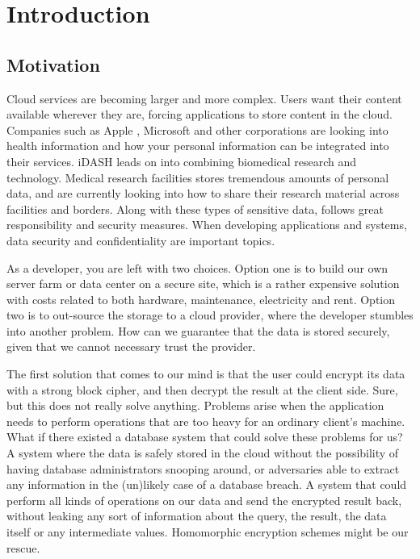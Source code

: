 \chapter{Introduction}
\label{chp:introduction}

\section{Motivation}

Cloud services are becoming larger and more complex. Users want their content available wherever they are, forcing applications to store content in the cloud. Companies such as Apple \cite{apple_health}, Microsoft \cite{microsoft_health} and other corporations are looking into health information and how your personal information can be integrated into their services. iDASH \cite{iDASH} leads on into combining biomedical research and technology.  Medical research facilities stores tremendous amounts of personal data, and are currently looking into how to share their research material across facilities and borders. Along with these types of sensitive data, follows great responsibility and security measures. When developing applications and systems, data security and confidentiality are important topics.


As a developer, you are left with two choices. Option one is to build our own server farm or data center on a secure site, which is a rather expensive solution with costs related to both hardware, maintenance, electricity and rent. Option two is to out-source the storage to a cloud provider, where the developer stumbles into another problem. How can we guarantee that the data is stored securely, given that we cannot necessary trust the provider.

The first solution that comes to our mind is that the user could encrypt its data with a strong block cipher, and then decrypt the result at the client side. Sure, but this does not really solve anything. Problems arise when the application needs to perform operations that are too heavy for an ordinary client's machine. What if there existed a database system that could solve these problems for us? A system where the data is safely stored in the cloud without the possibility of having database administrators snooping around, or adversaries able to extract any information in the (un)likely case of a database breach. A system that could perform all kinds of operations on our data and send the encrypted result back, without leaking any sort of information about the query, the result, the data itself or any intermediate values. Homomorphic encryption schemes might be our rescue.

